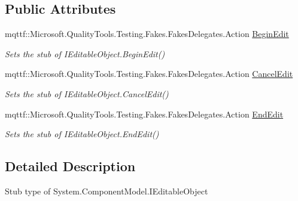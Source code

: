 \subsection*{Public Attributes}
\begin{DoxyCompactItemize}
\item 
mqttf\-::\-Microsoft.\-Quality\-Tools.\-Testing.\-Fakes.\-Fakes\-Delegates.\-Action \hyperlink{class_system_1_1_component_model_1_1_fakes_1_1_stub_i_editable_object_af7d9dcbad65370788ea67e22b82a9804}{Begin\-Edit}
\begin{DoxyCompactList}\small\item\em Sets the stub of I\-Editable\-Object.\-Begin\-Edit()\end{DoxyCompactList}\item 
mqttf\-::\-Microsoft.\-Quality\-Tools.\-Testing.\-Fakes.\-Fakes\-Delegates.\-Action \hyperlink{class_system_1_1_component_model_1_1_fakes_1_1_stub_i_editable_object_a599dabcd620199b2e6d76cfbde88e04a}{Cancel\-Edit}
\begin{DoxyCompactList}\small\item\em Sets the stub of I\-Editable\-Object.\-Cancel\-Edit()\end{DoxyCompactList}\item 
mqttf\-::\-Microsoft.\-Quality\-Tools.\-Testing.\-Fakes.\-Fakes\-Delegates.\-Action \hyperlink{class_system_1_1_component_model_1_1_fakes_1_1_stub_i_editable_object_a56df9035c7ac947bdc343ec3a8f10ac5}{End\-Edit}
\begin{DoxyCompactList}\small\item\em Sets the stub of I\-Editable\-Object.\-End\-Edit()\end{DoxyCompactList}\end{DoxyCompactItemize}


\subsection{Detailed Description}
Stub type of System.\-Component\-Model.\-I\-Editable\-Object



